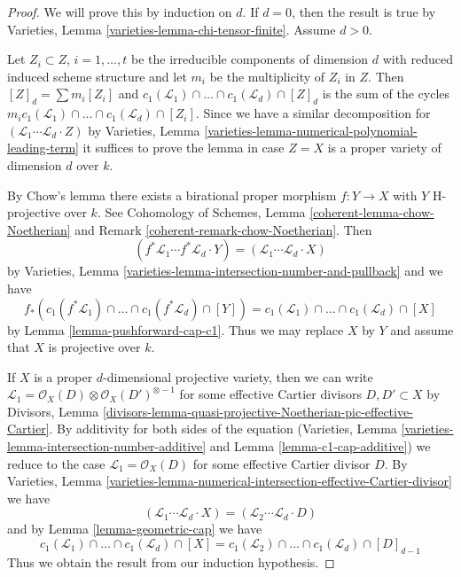 \begin{proof}
We will prove this by induction on $d$. If $d = 0$, then the result is
true by Varieties, Lemma \ref{varieties-lemma-chi-tensor-finite}.
Assume $d > 0$.

\medskip\noindent
Let $Z_i \subset Z$, $i = 1, \ldots, t$ be the irreducible components
of dimension $d$ with reduced induced scheme structure and let $m_i$ be the
multiplicity of $Z_i$ in $Z$. Then $[Z]_d = \sum m_i[Z_i]$ and
$c_1(\mathcal{L}_1) \cap \ldots \cap c_1(\mathcal{L}_d) \cap [Z]_d$
is the sum of the cycles
$m_i c_1(\mathcal{L}_1) \cap \ldots \cap c_1(\mathcal{L}_d) \cap [Z_i]$.
Since we have a similar decomposition for
$(\mathcal{L}_1 \cdots \mathcal{L}_d \cdot Z)$ by
Varieties, Lemma \ref{varieties-lemma-numerical-polynomial-leading-term}
it suffices to prove the lemma in case $Z = X$
is a proper variety of dimension $d$ over $k$.

\medskip\noindent
By Chow's lemma there exists a birational proper morphism $f : Y \to X$
with $Y$ H-projective over $k$. See Cohomology of Schemes, Lemma
\ref{coherent-lemma-chow-Noetherian} and Remark
\ref{coherent-remark-chow-Noetherian}. Then
$$
(f^*\mathcal{L}_1 \cdots f^*\mathcal{L}_d \cdot Y) =
(\mathcal{L}_1 \cdots \mathcal{L}_d \cdot X)
$$
by Varieties, Lemma \ref{varieties-lemma-intersection-number-and-pullback}
and we have
$$
f_*(c_1(f^*\mathcal{L}_1) \cap \ldots \cap c_1(f^*\mathcal{L}_d) \cap [Y]) =
c_1(\mathcal{L}_1) \cap \ldots \cap c_1(\mathcal{L}_d) \cap [X]
$$
by Lemma \ref{lemma-pushforward-cap-c1}. Thus we may replace $X$ by $Y$
and assume that $X$ is projective over $k$.

\medskip\noindent
If $X$ is a proper $d$-dimensional projective variety, then we can
write $\mathcal{L}_1 = \mathcal{O}_X(D) \otimes \mathcal{O}_X(D')^{\otimes -1}$
for some effective Cartier divisors $D, D' \subset X$
by Divisors, Lemma
\ref{divisors-lemma-quasi-projective-Noetherian-pic-effective-Cartier}.
By additivity for both sides of the equation
(Varieties, Lemma \ref{varieties-lemma-intersection-number-additive} and
Lemma \ref{lemma-c1-cap-additive})
we reduce to the case $\mathcal{L}_1 = \mathcal{O}_X(D)$ for some
effective Cartier divisor $D$.
By Varieties, Lemma
\ref{varieties-lemma-numerical-intersection-effective-Cartier-divisor}
we have
$$
(\mathcal{L}_1 \cdots \mathcal{L}_d \cdot X) =
(\mathcal{L}_2 \cdots \mathcal{L}_d \cdot D)
$$
and by Lemma \ref{lemma-geometric-cap} we have
$$
c_1(\mathcal{L}_1) \cap \ldots \cap c_1(\mathcal{L}_d) \cap [X] =
c_1(\mathcal{L}_2) \cap \ldots \cap c_1(\mathcal{L}_d) \cap [D]_{d - 1}
$$
Thus we obtain the result from our induction hypothesis.
\end{proof}







